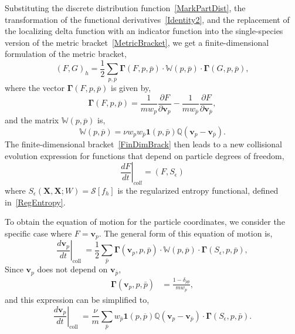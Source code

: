 \documentclass[preprint,12pt]{elsarticle}
\theoremstyle{definition}
\begin{document}
Substituting the discrete distribution function~\eqref{MarkPartDist}, the transformation of the functional derivatives~\eqref{Identity2}, and the replacement of the localizing delta function with an indicator function into the single-species version of the metric bracket~\eqref{MetricBracket}, we get a finite-dimensional formulation of the metric bracket, 
\begin{equation}
(F, G)_{h}=\frac{1}{2} \sum_{p, \overline{p}} \boldsymbol{\Gamma}(F, p, \overline{p}) \cdot \mathbb{W}(p, \overline{p}) \cdot \boldsymbol{\Gamma}(G, p, \overline{p}),
\label{FinDimBrack}
\end{equation} 
where the vector $\boldsymbol{\Gamma}(F, p, \overline{p})$ is given by,
\begin{equation}
\boldsymbol{\Gamma}(F, p, \overline{p}) = \frac{1}{m w_{p}} \frac{\partial F}{\partial \boldsymbol{v}_p} - \frac{1}{m w_{\overline{p}}} \frac{\partial F}{\partial \boldsymbol{v}_{\overline{p}}},
\label{Gamma}
\end{equation}
and the matrix $\mathbb{W}(p, \overline{p})$ is,
\begin{equation}
\mathbb{W}(p, \overline{p}) = \nu w_{p} w_{\bar{p}} \boldsymbol{1}(p, \bar{p}) \mathbb{Q}\left(\boldsymbol{v}_{p}-\boldsymbol{v}_{\bar{p}}\right).
\end{equation}
The finite-dimensional bracket~\eqref{FinDimBrack} then leads to a new collisional evolution expression for functions that depend on particle degrees of freedom,
\begin{equation}
\left. \frac{d F}{d t} \right|_{coll} = \left( F, S_{\epsilon} \right)
\end{equation}
where $S_{\epsilon} (\boldsymbol{X}, \boldsymbol{X}; W) = \mathcal{S} \left[ f_h \right]$ is the regularized entropy functional, defined in~\eqref{RegEntropy}.

To obtain the equation of motion for the particle coordinates, we consider the specific case where $F = \boldsymbol{v}_p$. The general form of this equation of motion is,
\begin{equation}
\left.\frac{d \boldsymbol{v}_{p}}{d t}\right|_{\text {coll }}= \frac{1}{2} \sum_{\bar{p}} \boldsymbol{\Gamma}\left(\boldsymbol{v}_p, p, \bar{p}\right) \cdot \mathbb{W}(p, \overline{p}) \cdot \boldsymbol{\Gamma}\left(S_{\epsilon}, p, \bar{p}\right),
\end{equation}
Since $\boldsymbol{v}_p$ does not depend on $\boldsymbol{v}_{\overline{p}}$,
\begin{align}
\boldsymbol{\Gamma}\left(\boldsymbol{v}_p, p, \bar{p}\right) &= \frac{1 - \delta_{p \overline{p}}}{m w_{p}},
\end{align}
and this expression can be simplified to,
\begin{equation}
\left.\frac{d \boldsymbol{v}_{p}}{d t}\right|_{\text {coll }} = \frac{\nu}{m} \sum_{\bar{p}}  w_{\overline{p}} \boldsymbol{1} (p, \overline{p}) \mathbb{Q} (\boldsymbol{v}_p - \boldsymbol{v}_{\overline{p}}) \cdot \boldsymbol{\Gamma}\left(S_{\epsilon}, p, \bar{p}\right).
\end{equation}
\end{document}
